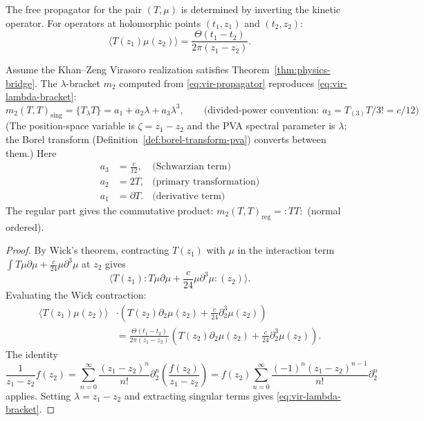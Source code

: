 The free propagator for the pair $(T, \mu)$ is determined by inverting the kinetic operator. For operators at holomorphic points $(t_1, z_1)$ and $(t_2, z_2)$:
\begin{equation}
\label{eq:vir-propagator}
\langle T(z_1) \mu(z_2) \rangle = \frac{\Theta(t_1 - t_2)}{2\pi(z_1 - z_2)}.
\end{equation}

\begin{proposition}
\label{prop:vir-m2}
Assume the Khan--Zeng Virasoro realization satisfies
Theorem~\ref{thm:physics-bridge}.
The $\lambda$-bracket $m_2$ computed from \eqref{eq:vir-propagator} reproduces \eqref{eq:vir-lambda-bracket}:
\begin{equation}
m_2(T, T)_\text{sing} = \{T_\lambda T\} = a_1 + a_2 \lambda + a_3 \lambda^3,
 \qquad\text{(divided-power convention: $a_3 = T_{(3)}T/3! = c/12$)}
\end{equation}
(The position-space variable is $\zeta = z_1 - z_2$ and the PVA spectral parameter is $\lambda$; the Borel transform
(Definition~\ref{def:borel-transform-pva}) converts between them.)
Here
\begin{align}
a_3 &= \frac{c}{12}, & \text{(Schwarzian term)}\\
a_2 &= 2T, & \text{(primary transformation)}\\
a_1 &= \partial T. & \text{(derivative term)}
\end{align}
The regular part gives the commutative product: $m_2(T,T)_\text{reg} = :TT:$ (normal ordered).
\end{proposition}

\begin{proof}
By Wick's theorem, contracting $T(z_1)$ with $\mu$ in the interaction term $\int T\mu\partial\mu + \frac{c}{24}\mu\partial^3\mu$ at $z_2$ gives
\[
\langle T(z_1) : T\mu\partial\mu + \frac{c}{24}\mu\partial^3\mu :(z_2) \rangle.
\]
Evaluating the Wick contraction:
\begin{align*}
\langle T(z_1) \mu(z_2) \rangle &\cdot \left( T(z_2) \partial_2 \mu(z_2) + \frac{c}{24} \partial_2^3 \mu(z_2) \right)\\
&= \frac{\Theta(t_1-t_2)}{2\pi(z_1-z_2)} \left( T(z_2) \partial_2 \mu(z_2) + \frac{c}{24} \partial_2^3 \mu(z_2) \right).
\end{align*}
The identity
\[
\frac{1}{z_1 - z_2} f(z_2) = \sum_{n=0}^\infty \frac{(z_1-z_2)^n}{n!} \partial_2^n \left( \frac{f(z_2)}{z_1-z_2} \right) = f(z_2) \sum_{n=0}^\infty \frac{(-1)^n (z_1-z_2)^{n-1}}{n!} \partial_2^n
\]
applies.
Setting $\lambda = z_1 - z_2$ and extracting singular terms gives \eqref{eq:vir-lambda-bracket}.
\end{proof}

